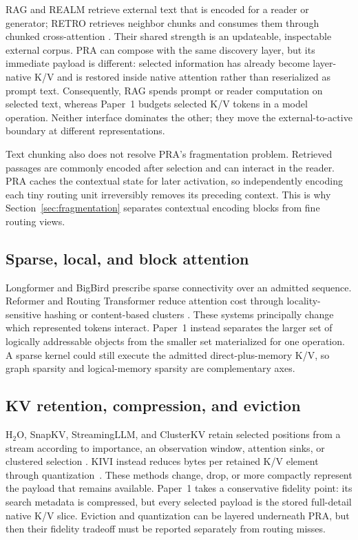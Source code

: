 \documentclass[11pt]{article}
\begin{document}
RAG and REALM retrieve external text that is encoded for a reader or generator; RETRO retrieves
neighbor chunks and consumes them through chunked cross-attention
\cite{lewis2020rag,guu2020realm,borgeaud2022retro}. Their shared strength is an updateable,
inspectable external corpus. PRA can compose with the same discovery layer, but its immediate
payload is different: selected information has already become layer-native K/V and is restored
inside native attention rather than reserialized as prompt text. Consequently, RAG spends prompt
or reader computation on selected text, whereas Paper~1 budgets selected K/V tokens in a model
operation. Neither interface dominates the other; they move the external-to-active boundary at
different representations.

Text chunking also does not resolve PRA's fragmentation problem. Retrieved passages are commonly
encoded after selection and can interact in the reader. PRA caches the contextual state for later
activation, so independently encoding each tiny routing unit irreversibly removes its preceding
context. This is why Section~\ref{sec:fragmentation} separates contextual encoding blocks from
fine routing views.

\subsection{Sparse, local, and block attention}

Longformer and BigBird prescribe sparse connectivity over an admitted sequence. Reformer and
Routing Transformer reduce attention cost through locality-sensitive hashing or content-based
clusters \cite{beltagy2020longformer,zaheer2020bigbird,kitaev2020reformer,roy2021routing}.
These systems principally change which represented tokens interact. Paper~1 instead separates
the larger set of logically addressable objects from the smaller set materialized for one
operation. A sparse kernel could still execute the admitted direct-plus-memory K/V, so graph
sparsity and logical-memory sparsity are complementary axes.

\subsection{KV retention, compression, and eviction}

H$_2$O, SnapKV, StreamingLLM, and ClusterKV retain selected positions from a stream according to
importance, an observation window, attention sinks, or clustered selection
\cite{zhang2023h2o,li2024snapkv,xiao2023streamingllm,liu2024clusterkv}. KIVI instead reduces
bytes per retained K/V element through quantization~\cite{liu2024kivi}. These methods change,
drop, or more compactly represent the payload that remains available. Paper~1 takes a
conservative fidelity point: its search metadata is compressed, but every selected payload is
the stored full-detail native K/V slice. Eviction and quantization can be layered underneath PRA,
but then their fidelity tradeoff must be reported separately from routing misses.
\end{document}
